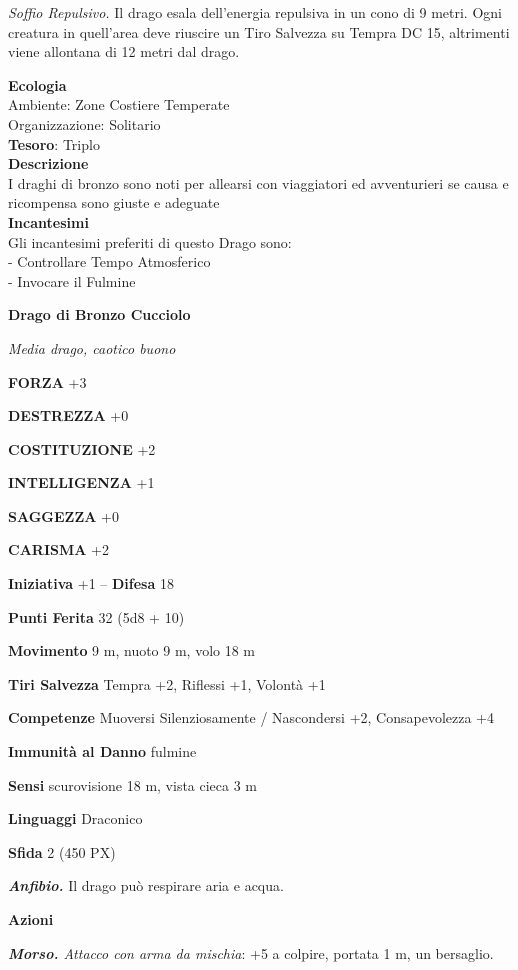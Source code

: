 \begin{multicols}{2}
\textit{Soffio Repulsivo.} Il drago esala dell'energia repulsiva in un cono di 9 metri. Ogni creatura in quell'area deve riuscire un Tiro Salvezza su Tempra DC 15, altrimenti viene allontana di 12 metri dal drago.

\textbf{Ecologia}\\
Ambiente: Zone Costiere Temperate\\
Organizzazione: Solitario\\
\textbf{Tesoro}: Triplo\\
\textbf{Descrizione}\\
I draghi di bronzo sono noti per allearsi con viaggiatori ed avventurieri se causa e ricompensa sono giuste e adeguate\\
\textbf{Incantesimi}\\
Gli incantesimi preferiti di questo Drago sono:\\
- Controllare Tempo Atmosferico\\
- Invocare il Fulmine


\medskip{}\textbf{Drago di Bronzo Cucciolo}

\textit{Media drago, caotico buono}

\textbf{FORZA} +3

\textbf{DESTREZZA} +0

\textbf{COSTITUZIONE} +2

\textbf{INTELLIGENZA} +1

\textbf{SAGGEZZA} +0

\textbf{CARISMA} +2

\textbf{Iniziativa} +1 -- \textbf{Difesa} 18

\textbf{Punti Ferita} 32 (5d8 + 10)

\textbf{Movimento} 9 m, nuoto 9 m, volo 18 m

\textbf{Tiri Salvezza} Tempra +2, Riflessi +1, Volontà +1

\textbf{Competenze} Muoversi Silenziosamente / Nascondersi +2, Consapevolezza +4

\textbf{Immunità al Danno} fulmine

\textbf{Sensi} scurovisione 18 m, vista cieca 3 m

\textbf{Linguaggi} Draconico

\textbf{Sfida} 2 (450 PX)

\textit{\textbf{Anfibio.}} Il drago può respirare aria e acqua.

\textbf{Azioni}

\textit{\textbf{Morso.} Attacco con arma da mischia}: +5 a colpire,
portata 1 m, un bersaglio.


\end{multicols}
